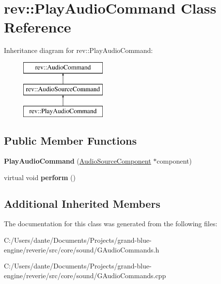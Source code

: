 \hypertarget{classrev_1_1_play_audio_command}{}\section{rev\+::Play\+Audio\+Command Class Reference}
\label{classrev_1_1_play_audio_command}
Inheritance diagram for rev\+::Play\+Audio\+Command\+:\begin{figure}[H]
\begin{center}
\leavevmode
\includegraphics[height=3.000000cm]{classrev_1_1_play_audio_command}
\end{center}
\end{figure}
\subsection*{Public Member Functions}
\begin{DoxyCompactItemize}
\item 
\mbox{\label{classrev_1_1_play_audio_command_add3d55be7a9929b51c7fe89729f47554}} 
{\bfseries Play\+Audio\+Command} (\mbox{\hyperlink{classrev_1_1_audio_source_component}{Audio\+Source\+Component}} $\ast$component)
\item 
\mbox{\label{classrev_1_1_play_audio_command_a63e6067d1b6cbb122714d5c9cd354a31}} 
virtual void {\bfseries perform} ()
\end{DoxyCompactItemize}
\subsection*{Additional Inherited Members}


The documentation for this class was generated from the following files\+:\begin{DoxyCompactItemize}
\item 
C\+:/\+Users/dante/\+Documents/\+Projects/grand-\/blue-\/engine/reverie/src/core/sound/G\+Audio\+Commands.\+h\item 
C\+:/\+Users/dante/\+Documents/\+Projects/grand-\/blue-\/engine/reverie/src/core/sound/G\+Audio\+Commands.\+cpp\end{DoxyCompactItemize}
